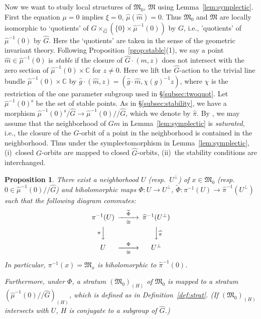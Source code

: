 \documentclass[12pt]{amsart}
\def\Bbb{\mathbb}
\def\frak{\mathfrak}
\newcommand{\rom}{\textup}
\newtheorem{Proposition}[equation]{Proposition}
\theoremstyle{definition}
\theoremstyle{remark}
\numberwithin{equation}{subsection}
\newcommand{\lemref}[1]{Lemma~\ref{#1}}
\newcommand{\propref}[1]{Proposition~\ref{#1}}
\newcommand{\subsecref}[1]{\S\ref{#1}}
\newcommand{\defref}[1]{Definition~\ref{#1}}
\newcommand{\C}{{\Bbb C}}
\newcommand{\M}{{\frak M}} %
\newcommand{\dslash}{/\!\!/} %
\begin{document}
Now we want to study local structures of $\M_0$, $\M$ using
\lemref{lem:symplectic}. First the equation $\mu = 0$ implies
$\xi = 0$, ${\widehat\mu}(\widehat m) = 0$. Thus $\M_0$ and $\M$ are
locally isomorphic to `quotients' of 
$G\times_{\widehat G}(\{0\}\times{\widehat\mu}^{-1}(0))$ by $G$,
i.e., 'quotients' of ${\widehat\mu}^{-1}(0)$ by $\widehat G$.
Here the `quotients' are taken in the sense of the geometric invariant 
theory.
%
Following \propref{prop:stable}(1), we say a point $\widehat
m\in{\widehat\mu}^{-1}(0)$ is {\it stable\/} if the closure of
$\widehat G\cdot (m,z)$ does not intersect with the zero section of
${\widehat\mu}^{-1}(0)\times\C$ for $z\neq 0$.
%
Here we lift the $\widehat G$-action to the trivial line bundle
${\widehat\mu}^{-1}(0)\times\C$ by $\widehat g\cdot(\widehat m,z) =
(\widehat g\cdot\widehat m, \chi(g)^{-1}z)$, where $\chi$ is the
restriction of the one parameter subgroup used in
\subsecref{subsec:twoquot}.
%
Let ${\widehat\mu}^{-1}(0)^{\operatorname{s}}$ be the set of stable
points. As in \subsecref{subsec:stability}, we have a morphism
${\widehat\mu}^{-1}(0)^{\operatorname{s}}/\widehat G \to
{\widehat\mu}^{-1}(0)\dslash \widehat G$, which we denote by
$\widehat\pi$.
%
By \cite[Proposition~2.7]{Sj}, we may assume that the neighborhood of
$Gm$ in \lemref{lem:symplectic} is {\it saturated}, i.e., the closure
of the $G$-orbit of a point in the neighborhood is contained in the
neighborhood. Thus under the symplectomorphism in
\lemref{lem:symplectic}, (i)~closed $G$-orbits are mapped to closed
$\widehat G$-orbits, (ii)~the stability conditions are interchanged.

\begin{Proposition}\label{prop:localslice}
There exist a neighborhood $U$ \rom(resp.\ $U^\perp$\rom) of
$x\in\M_0$ \rom(resp.\ $0\in{\widehat\mu}^{-1}(0)\dslash\widehat
G$\rom) and biholomorphic maps $\Phi\colon U\to U^\perp$,
$\widetilde\Phi\colon \pi^{-1}(U)\to{\widehat\pi}^{-1}(U^\perp)$
such that the following diagram commutes\rom:
\begin{equation*}
\begin{CD}
   \pi^{-1}(U) @>\widetilde\Phi>\cong> {\widehat\pi}^{-1}(U^\perp)
\\
%
   @V{\pi}VV @VV\widehat{\pi}V \\
%
   U @>\Phi>\cong> U^\perp
\end{CD}
\end{equation*}
In particular, $\pi^{-1}(x) = \M_x$ is biholomorphic to
${\widehat\pi}^{-1}(0)$.

Furthermore, under $\Phi$, a stratum $(\M_0)_{(H)}$ of $\M_0$ is
mapped to a stratum $\left({\widehat\mu}^{-1}(0)\dslash\widehat
  G\right)_{(H)}$, which is defined as in \defref{def:strat}. \rom(If
$(\M_0)_{(H)}$ intersects with $U$, $H$ is conjugate to a subgroup of
$\widehat G$.\rom)
\end{Proposition}
\end{document}
